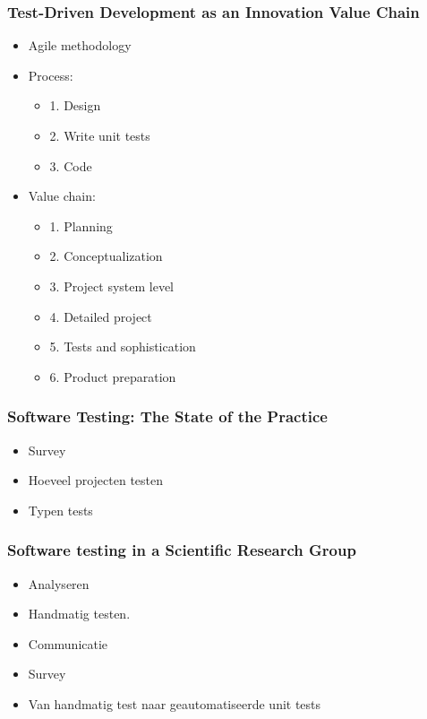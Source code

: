 \documentclass[10pt]{beamer}
\begin{document}
	\begin{frame}
		\frametitle{Test-Driven Development as an Innovation Value Chain}
		\begin{itemize}
			\item Agile methodology
			\item Process:
				\begin{itemize}
					\item 1. Design
					\item 2. Write unit tests
					\item 3. Code
				\end{itemize}
			\item Value chain:
				\begin{itemize}
					\item 1. Planning
					\item 2. Conceptualization
					\item 3. Project system level
					\item 4. Detailed project
					\item 5. Tests and sophistication
					\item 6. Product preparation
				\end{itemize}
		\end{itemize}
	\end{frame}

	\begin{frame}
		\frametitle{Software Testing: The State of the Practice}
		\begin{itemize}
			\item Survey
			\item Hoeveel projecten testen
			\item Typen tests
		\end{itemize}
	\end{frame}	

	\begin{frame}
		\frametitle{Software testing in a Scientific Research Group}
		\begin{itemize}
			\item Analyseren 
			\item Handmatig testen.
			\item Communicatie
			\item Survey
			\item Van handmatig test naar geautomatiseerde unit tests
		\end{itemize} 
	\end{frame}
\end{document}
